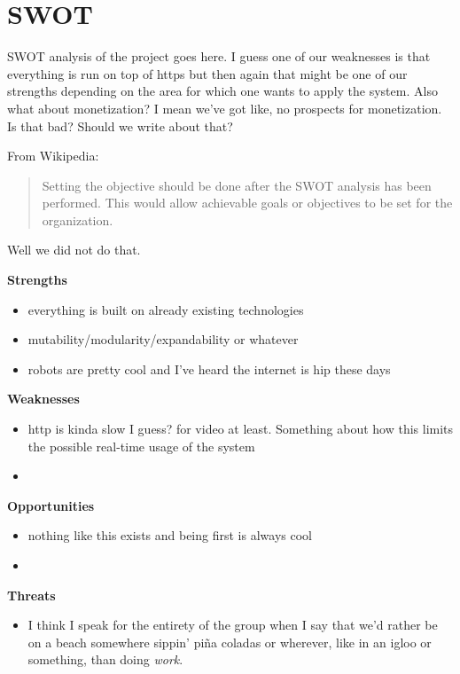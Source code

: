 \chapter{SWOT}
SWOT analysis of the project goes here.
I guess one of our weaknesses is that everything is run on top of https but then again that might be one of our strengths depending on the area for which one wants to apply the system.
Also what about monetization?
I mean we've got like, no prospects for monetization.
Is that bad? Should we write about that?

From Wikipedia:
\begin{quote}
Setting the objective should be done after the SWOT analysis has been performed. This would allow achievable goals or objectives to be set for the organization.
\end{quote}
Well we did not do that.\newline


\textbf{\Large Strengths}
\begin{itemize}
	\item everything is built on already existing technologies
	\item mutability/modularity/expandability or whatever
	\item robots are pretty cool and I've heard the internet is hip these days
\end{itemize}

\textbf{\Large Weaknesses}
\begin{itemize}
	\item http is kinda slow I guess? for video at least. Something about how this limits the possible real-time usage of the system
	\item 
\end{itemize}

\textbf{\Large Opportunities}
\begin{itemize}
	\item nothing like this exists and being first is always cool
	\item 
\end{itemize}

\textbf{\Large Threats}
\begin{itemize}
	\item I think I speak for the entirety of the group when I say that we'd rather be on a beach somewhere sippin' piña coladas or wherever, like in an igloo or something, than doing \textit{work}.
\end{itemize}
